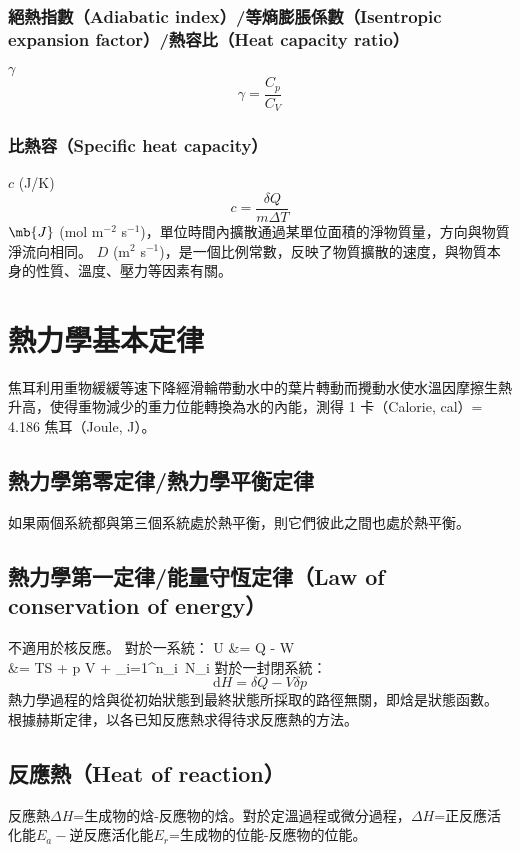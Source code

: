 \documentclass[a4paper,12pt]{report}
\begin{document}
\subsubsection{絕熱指數（Adiabatic index）/等熵膨脹係數（Isentropic expansion factor）/熱容比（Heat capacity ratio）}
$\gamma$
\[\gamma = \frac{C_p}{C_V}\]
\subsubsection{比熱容（Specific heat capacity）}
$c$ (J/K)
\[c=\frac{\delta Q}{m\Delta T}\]
$\mb{J}$ (mol m$^{-2}$ s$^{-1}$)，單位時間內擴散通過某單位面積的淨物質量，方向與物質淨流向相同。
$D$ (m$^2$ s$^{-1}$)，是一個比例常數，反映了物質擴散的速度，與物質本身的性質、溫度、壓力等因素有關。


\section{熱力學基本定律}
焦耳利用重物緩緩等速下降經滑輪帶動水中的葉片轉動而攪動水使水溫因摩擦生熱升高，使得重物減少的重力位能轉換為水的內能，測得 1 卡（Calorie, cal）= 4.186 焦耳（Joule, J）。
\subsection{熱力學第零定律/熱力學平衡定律}
如果兩個系統都與第三個系統處於熱平衡，則它們彼此之間也處於熱平衡。
\subsection{熱力學第一定律/能量守恆定律（Law of conservation of energy）}
不適用於核反應。
對於一系統：
\bma
{}U &= \delta Q - \delta W\\
&= TS + p \delta V + \sum _{i=1}^{n}\mu _{i}\, N_i
\eam
{}
對於一封閉系統：
\[\mathrm{d}H = \delta Q - V\delta p \]
熱力學過程的焓與從初始狀態到最終狀態所採取的路徑無關，即焓是狀態函數。
根據赫斯定律，以各已知反應熱求得待求反應熱的方法。
\subsection{反應熱（Heat of reaction）}
反應熱$\Delta H$=生成物的焓-反應物的焓。對於定溫過程或微分過程，$\Delta H$=正反應活化能$E_a-$逆反應活化能$E_r$=生成物的位能-反應物的位能。
\end{document}
